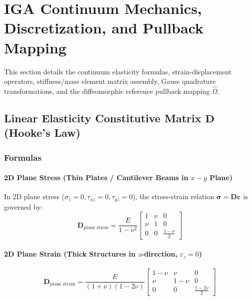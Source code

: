 \section{IGA Continuum Mechanics, Discretization, and Pullback Mapping}
\label{sec:iga_discretization}

This section details the continuum elasticity formulas, strain-displacement operators, stiffness/mass element matrix assembly, Gauss quadrature transformations, and the diffeomorphic reference pullback mapping $\hat{\Omega}$.

\subsection{Linear Elasticity Constitutive Matrix $\mathbf{D}$ (Hooke's Law)}

\subsubsection{Formulas}
\paragraph{2D Plane Stress (Thin Plates / Cantilever Beams in $x-y$ Plane)}
In 2D plane stress ($\sigma_z = 0, \tau_{xz} = 0, \tau_{yz} = 0$), the stress-strain relation $\boldsymbol{\sigma} = \mathbf{D} \boldsymbol{\varepsilon}$ is governed by:
\begin{equation}
\mathbf{D}_{\text{plane stress}} = \frac{E}{1 - \nu^2} \begin{bmatrix} 
1 & \nu & 0 \\ 
\nu & 1 & 0 \\ 
0 & 0 & \frac{1 - \nu}{2} 
\end{bmatrix}
\end{equation}

\paragraph{2D Plane Strain (Thick Structures in $z$-direction, $\varepsilon_z = 0$)}
\begin{equation}
\mathbf{D}_{\text{plane strain}} = \frac{E}{(1 + \nu)(1 - 2\nu)} \begin{bmatrix} 
1 - \nu & \nu & 0 \\ 
\nu & 1 - \nu & 0 \\ 
0 & 0 & \frac{1 - 2\nu}{2} 
\end{bmatrix}
\end{equation}

